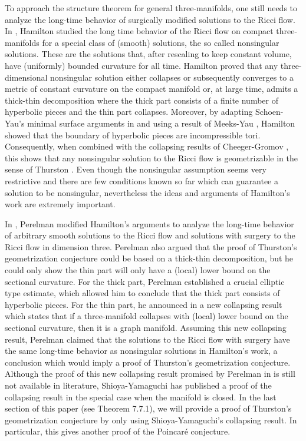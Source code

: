 \vskip 0.1cm 

To approach the structure theorem for general three-manifolds, one
still needs to analyze the long-time behavior of surgically
modified solutions to the Ricci flow. In \cite{Ha99}, Hamilton
studied the long time behavior of the Ricci flow on compact
three-manifolds for a special class of (smooth) solutions, the so
called nonsingular solutions. These are the solutions that, after
rescaling to keep constant volume, have (uniformly) bounded
curvature for all time. Hamilton \cite{Ha99} proved that any
three-dimensional nonsingular solution either collapses or
subsequently converges to a metric of constant curvature on the
compact manifold or, at large time, admits a thick-thin
decomposition where the thick part consists of a finite number of
hyperbolic pieces and the thin part collapses. Moreover, by
adapting Schoen-Yau's minimal surface arguments in \cite{ScY79}
and using a result of Meeks-Yau \cite{MY}, Hamilton showed that
the boundary of hyperbolic pieces are incompressible tori.
Consequently, when combined with the collapsing results of
Cheeger-Gromov \cite{ChG86, ChG90}, this shows that any
nonsingular solution to the Ricci flow is geometrizable in the
sense of Thurston \cite{Th82}. Even though the nonsingular
assumption seems very restrictive and there are few conditions
known so far which can guarantee a solution to be nonsingular,
nevertheless the ideas and arguments of Hamilton's work
\cite{Ha99} are extremely important.

In \cite{P2}, Perelman modified Hamilton's arguments to analyze
the long-time behavior of arbitrary smooth solutions to the Ricci
flow and solutions with surgery to the Ricci flow in dimension
three. Perelman also argued that the proof of Thurston's
geometrization conjecture could be based on a thick-thin
decomposition, but he could only show the thin part will only have
a (local) lower bound on the sectional curvature. For the thick
part, Perelman \cite{P2} established a crucial elliptic type
estimate, which allowed him to conclude that the thick part
consists of hyperbolic pieces. For the thin part, he announced in
\cite{P2} a new collapsing result which states that if a
three-manifold collapses with (local) lower bound on the sectional
curvature, then it is a graph manifold. Assuming this new
collapsing result, Perelman \cite{P2} claimed that the solutions
to the Ricci flow with surgery have the same long-time behavior as
nonsingular solutions in Hamilton's work, a conclusion which would
imply a proof of Thurston's geometrization conjecture. Although
the proof of this new collapsing result promised by Perelman in
\cite{P2} is still not available in literature, Shioya-Yamaguchi
\cite{ShY} has published a proof of the collapsing result in the
special case when the manifold is closed. In the last section of
this paper (see Theorem 7.7.1), we will provide a proof of
Thurston's geometrization conjecture by only using
Shioya-Yamaguchi's collapsing result. In particular, this gives
another proof of the Poincar\'e conjecture.

